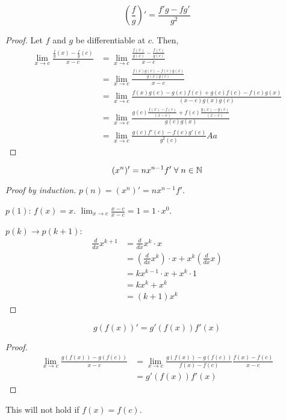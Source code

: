 \begin{theorem}
    $$(\frac{f}{g})' = \frac{f'g - fg'}{g^2}$$
\end{theorem}
\begin{proof}
    Let $f$ and $g$ be differentiable at $c$. Then,
    \begin{align*}
        \lim_{x \to c} \frac{\frac{f}{g}(x) - \frac{f}{g}(c)}{x - c} &= \lim_{x \to c} \frac{\frac{f(x)}{g(x)} - \frac{f(c)}{g(c)}}{x - c} \\
        &= \lim_{x \to c} \frac{\frac{f(x)g(c) - f(c)g(x)}{g(x)g(c)}}{x - c} \\
        &= \lim_{x \to c} \frac{f(x)g(c) - g(c)f(c) + g(c)f(c) - f(c)g(x)}{(x - c) g(x)g(c)} \\
        &= \lim_{x \to c} \frac{g(c) \frac{f(x) - f(c)}{(x - c)} + f(c) \frac{g(x) - g(c)}{(x - c)}}{g(c)g(x)} \\
        &= \lim_{x \to c} \frac{g(c)f'(c) - f(c)g'(c)}{g^2(c)}Aa
    \end{align*}
\end{proof}

\begin{theorem}
    $$(x^n)' = nx^{n - 1}f' \;\forall\; n \in \mathbb{N}$$
\end{theorem}
\begin{proof}[Proof by induction]
    $p(n) = (x^n)' = nx^{n - 1}f'$.

    $p(1)$: $f(x) = x$. $\lim_{x \to c} \frac{x - c}{x - c} = 1 = 1 \cdot x^0$.

    $p(k) \rightarrow p(k + 1)$:
    \begin{align*}
        \frac{d}{dx} x^{k + 1} &= \frac{d}{dx} x^k \cdot x \\
        &= (\frac{d}{dx} x^k) \cdot x + x^k (\frac{d}{dx} x) \\
        &= kx^{k - 1} \cdot x + x^k \cdot 1 \\
        &= kx^k + x^k \\
        &= (k + 1)x^k
    \end{align*}
\end{proof}

\begin{theorem}
    $$g(f(x))' = g'(f(x))f'(x)$$
\end{theorem}
\begin{proof}
    \begin{align*}
        \lim_{x \to c} \frac{g(f(x)) - g(f(c))}{x - c} &= \lim_{x \to c} \frac{g(f(x)) - g(f(c))}{f(x) - f(c)} \frac{f(x) - f(c)}{x - c} \\
        &= g'(f(x)) f'(x)
    \end{align*}
\end{proof}
\begin{remark}
    This will not hold if $f(x) = f(c)$.
\end{remark}

